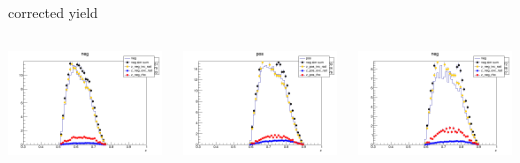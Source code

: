 \begin{frame}{corrected yield}
\begin{columns}
\begin{column}[T]{0.25\textwidth}
\includegraphics[width = \textwidth]{results/yield/statistics_corr/yield_x_Q2_z_0.35_4.000_0.60_neg.png}
\end{column}
\begin{column}[T]{0.25\textwidth}
\includegraphics[width = \textwidth]{results/yield/statistics_corr/yield_x_Q2_z_0.35_4.000_0.70_pos.png}
\end{column}
\begin{column}[T]{0.25\textwidth}
\includegraphics[width = \textwidth]{results/yield/statistics_corr/yield_x_Q2_z_0.35_4.000_0.70_neg.png}
\end{column}
\end{columns}
\end{frame}
